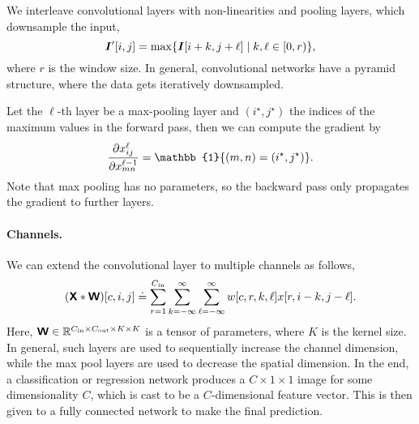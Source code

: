 We interleave convolutional layers with non-linearities and pooling layers, which downsample the
input, \[
    \bm{I}'[i,j] = \max \{ \bm{I}[i+k,j+\ell] \mid k, \ell \in [0, r) \},
\]
where $r$ is the window size. In general, convolutional networks have a pyramid structure, where
the data gets iteratively downsampled.

Let the $\ell$-th layer be a max-pooling layer and $(i^\star,j^\star)$ the indices of the maximum
values in the forward pass, then we can compute the gradient by \[
    \pdv{x^{\ell}_{ij}}{x^{\ell-1}_{mn}} = \mathbb{1}\{ (m,n) = (i^\star, j^\star) \}.
\]
Note that max pooling has no parameters, so the backward pass only propagates the gradient to
further layers.

\paragraph{Channels.}

We can extend the convolutional layer to multiple channels as follows, \[
    (\bm{\mathsf{X}} * \bm{\mathsf{W}})[c, i, j] \doteq \sum_{r=1}^{C_\mathrm{in}} \sum_{k=-\infty}^{\infty} \sum_{\ell=-\infty}^{\infty} w[c,r,k,\ell] x[r, i-k, j-\ell].
\]
Here, $\bm{\mathsf{W}} \in \mathbb{R}^{C_{\mathrm{in}} \times C_{\mathrm{out}} \times K \times K}$ is a tensor of
parameters, where $K$ is the kernel size. In general, such layers are used to sequentially increase
the channel dimension, while the max pool layers are used to decrease the spatial dimension. In the
end, a classification or regression network produces a $C \times 1 \times 1$ image for some
dimensionality $C$, which is cast to be a $C$-dimensional feature vector. This is then given to a
fully connected network to make the final prediction.
